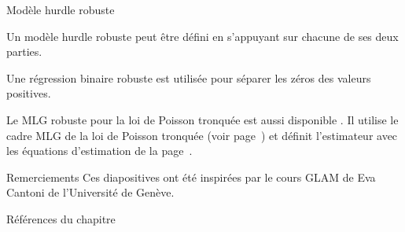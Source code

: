 \documentclass{BeamerTemplate}
\begin{document}
\begin{refsection}
\begin{frame}{Modèle hurdle robuste}

Un {\color{blue}modèle hurdle robuste} peut être défini en s'appuyant sur chacune de ses deux parties.

\bigskip
Une régression binaire robuste est utilisée pour séparer les zéros des valeurs positives.

\bigskip
Le MLG robuste pour la loi de Poisson tronquée est aussi disponible \cite{Cant:Zedi:2011}. Il utilise le cadre MLG de la loi de Poisson tronquée (voir page~\pageref{truncpoisdef}) et définit l'estimateur avec les équations d'estimation de la page~\pageref{EE.eq}.
\end{frame}

\begin{frame}{Remerciements}
Ces diapositives ont été inspirées par le cours GLAM de Eva Cantoni de l'Université de Genève.
\end{frame}

\begin{frame}[allowframebreaks]{Références du chapitre}
\tiny
\printbibliography[heading=none,section=\therefsection]
\end{frame}

\end{refsection}
\end{document}
